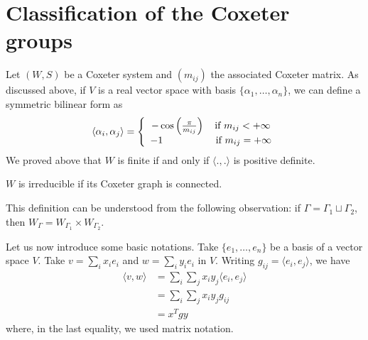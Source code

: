 \section{Classification of the Coxeter groups}

Let $(W,S)$ be a Coxeter system and $(m_{ij})$ the associated Coxeter matrix. As discussed above, if $V$ is a real vector space with basis $\{\alpha_1, \ldots , \alpha_n\}$, we can define a symmetric bilinear form as
\begin{equation}
\langle \alpha_i , \alpha_j \rangle = \left \{
\begin{array}{c @{} c}
    &- \cos \left(\frac{\pi}{m_{ij}} \right) \quad \text{if } m_{ij} < + \infty \\
    &-1 \quad ~~~~~~~~~~~~~\text{if } m_{ij} = + \infty \\
\end{array}
\right.
\end{equation} We proved above that $W$ is finite if and only if $\langle ., . \rangle$ is positive definite.

\begin{definition}
$W$ is irreducible if its Coxeter graph is connected.
\end{definition}

This definition can be understood from the following observation: if $\Gamma = \Gamma_1 \sqcup \Gamma_2$, then $W_\Gamma = W_{\Gamma_1} \times W_{\Gamma_2}$.

Let us now introduce some basic notations. Take $\{ e_1, \ldots, e_n \}$ be a basis of a vector space $V$. Take $v = \sum_i x_i e_i$ and $w =  \sum_i y_i e_i$ in $V$. Writing $g_{ij} = \langle e_i , e_j \rangle$, we have
\begin{equation}
\begin{split}
\langle v, w \rangle &= \sum_i \sum_j x_i y_j \langle e_i, e_j \rangle \\
&= \sum_i \sum_j x_i y_j g_{ij} \\
&= x^T g y
\end{split}
\end{equation} where, in the last equality, we used matrix notation.

